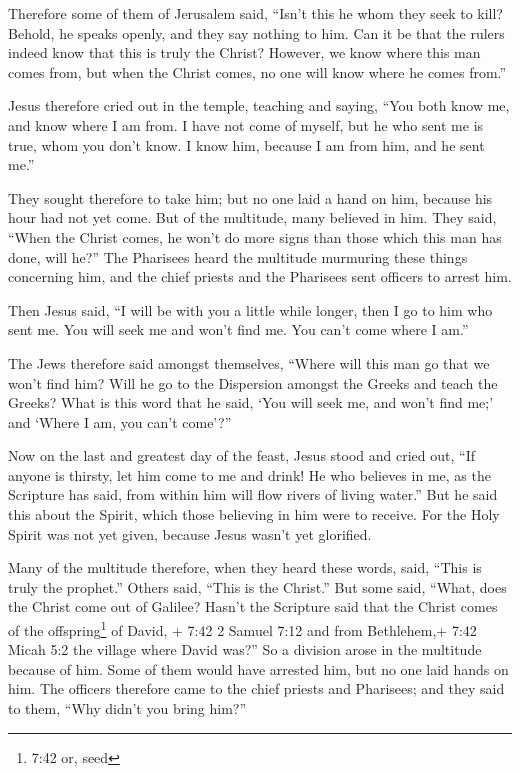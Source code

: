  Therefore some of them of Jerusalem said, ``Isn't this he
whom they seek to kill?  Behold, he speaks openly, and they
say nothing to him. Can it be that the rulers indeed know that this is
truly the Christ?  However, we know where this man comes
from, but when the Christ comes, no one will know where he comes from.''

 Jesus therefore cried out in the temple, teaching and
saying, ``You both know me, and know where I am from. I have not come of
myself, but he who sent me is true, whom you don't know.  I
know him, because I am from him, and he sent me.''

 They sought therefore to take him; but no one laid a hand
on him, because his hour had not yet come.  But of the
multitude, many believed in him. They said, ``When the Christ comes, he
won't do more signs than those which this man has done, will he?''
 The Pharisees heard the multitude murmuring these things
concerning him, and the chief priests and the Pharisees sent officers to
arrest him.

 Then Jesus said, ``I will be with you a little while
longer, then I go to him who sent me.  You will seek me and
won't find me. You can't come where I am.''

 The Jews therefore said amongst themselves, ``Where will
this man go that we won't find him? Will he go to the Dispersion amongst
the Greeks and teach the Greeks?  What is this word that he
said, `You will seek me, and won't find me;' and `Where I am, you can't
come'?''

 Now on the last and greatest day of the feast, Jesus stood
and cried out, ``If anyone is thirsty, let him come to me and drink!
 He who believes in me, as the Scripture has said, from
within him will flow rivers of living water.''  But he said
this about the Spirit, which those believing in him were to receive. For
the Holy Spirit was not yet given, because Jesus wasn't yet glorified.

 Many of the multitude therefore, when they heard these
words, said, ``This is truly the prophet.''  Others said,
``This is the Christ.'' But some said, ``What, does the Christ come out
of Galilee?  Hasn't the Scripture said that the Christ
comes of the offspring\footnote{7:42 or, seed} of David, + 7:42 2 Samuel
7:12 and from Bethlehem,+ 7:42 Micah 5:2 the village where David was?''
 So a division arose in the multitude because of him.
 Some of them would have arrested him, but no one laid
hands on him.  The officers therefore came to the chief
priests and Pharisees; and they said to them, ``Why didn't you bring
him?''

